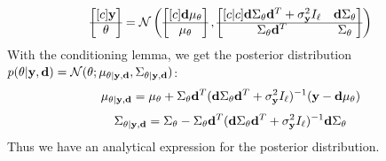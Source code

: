 \begin{equation}
  \begin{bmatrix}[c]
    \mathbf{y}\\
    \hline
    \theta 
  \end{bmatrix}
  =
  \mathcal{N}\left(
    \begin{bmatrix}[c]
      \mathbf{d}\mu_\theta\\
      \hline
      \mu_\theta
    \end{bmatrix},
    \begin{bmatrix}[c | c]
      \mathbf{d}\Sigma_{\mathbf{\theta}}\mathbf{d}^T + \sigma^2_{\mathbf{y}} I_\ell &     \mathbf{d}\Sigma_{\mathbf{\theta}} \\ 
      \hline
      \Sigma_{\mathbf{\theta}}\mathbf{d}^T & \Sigma_{\mathbf{\theta}}
    \end{bmatrix}
  \right)
\end{equation} 
With the conditioning lemma, we get the posterior distribution $p(\theta | \mathbf{y}, \mathbf{d}) = \mathcal{N}(\theta; \mu_{\theta| \mathbf{y}, \mathbf{d}}, \Sigma_{\theta | \mathbf{y}, \mathbf{d}})$:
\begin{equation}
  \label{eq:posterior-mean}
  \mu_{\theta | \mathbf{y}, \mathbf{d}} = \mu_\theta + \Sigma_\theta \mathbf{d}^T (\mathbf{d} \Sigma_\theta \mathbf{d}^T + \sigma^2_{\mathbf{y}} I_\ell)^{-1}(\mathbf{y} - \mathbf{d}\mu_\theta)
\end{equation}
\begin{equation}
  \label{eq:posterior-cov}
  \Sigma_{\theta | \mathbf{y}, \mathbf{d}} = \Sigma_\theta - \Sigma_\theta \mathbf{d}^T (\mathbf{d} \Sigma_\theta \mathbf{d}^T + \sigma^2_{\mathbf{y}} I_\ell)^{-1}\mathbf{d}\Sigma_\theta
\end{equation}
Thus we have an analytical expression for the posterior distribution.
